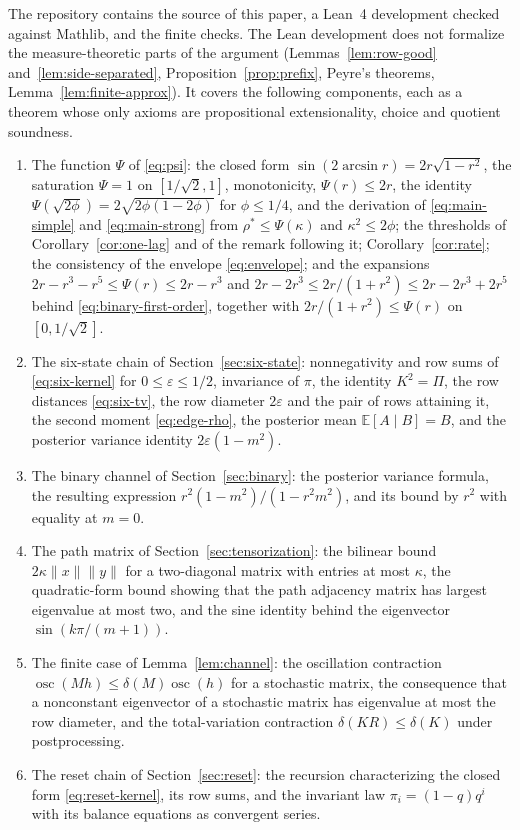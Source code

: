 \documentclass[11pt]{amsart}
\numberwithin{equation}{section}
\theoremstyle{definition}
\newcommand{\EE}{\mathbb E}
\newcommand{\osc}{\operatorname{osc}}
\newcommand{\rhostar}{\rho^{*}}
\begin{document}
The repository \cite{Repo2026} contains the source of this paper, a Lean~4 development checked against Mathlib, and the finite checks. The Lean development does not formalize the measure-theoretic parts of the argument (Lemmas~\ref{lem:row-good} and~\ref{lem:side-separated}, Proposition~\ref{prop:prefix}, Peyre's theorems, Lemma~\ref{lem:finite-approx}). It covers the following components, each as a theorem whose only axioms are propositional extensionality, choice and quotient soundness.
\begin{enumerate}
\item The function $\Psi$ of \eqref{eq:psi}: the closed form $\sin(2\arcsin r)=2r\sqrt{1-r^2}$, the saturation $\Psi=1$ on $[1/\sqrt2,1]$, monotonicity, $\Psi(r)\le2r$, the identity $\Psi(\sqrt{2\phi})=2\sqrt{2\phi(1-2\phi)}$ for $\phi\le1/4$, and the derivation of \eqref{eq:main-simple} and \eqref{eq:main-strong} from $\rhostar\le\Psi(\kappa)$ and $\kappa^2\le2\phi$; the thresholds of Corollary~\ref{cor:one-lag} and of the remark following it; Corollary~\ref{cor:rate}; the consistency of the envelope \eqref{eq:envelope}; and the expansions $2r-r^3-r^5\le\Psi(r)\le2r-r^3$ and $2r-2r^3\le2r/(1+r^2)\le2r-2r^3+2r^5$ behind \eqref{eq:binary-first-order}, together with $2r/(1+r^2)\le\Psi(r)$ on $[0,1/\sqrt2]$.
\item The six-state chain of Section~\ref{sec:six-state}: nonnegativity and row sums of \eqref{eq:six-kernel} for $0\le\varepsilon\le1/2$, invariance of $\pi$, the identity $K^2=\Pi$, the row distances \eqref{eq:six-tv}, the row diameter $2\varepsilon$ and the pair of rows attaining it, the second moment \eqref{eq:edge-rho}, the posterior mean $\EE[A\mid B]=B$, and the posterior variance identity $2\varepsilon(1-m^2)$.
\item The binary channel of Section~\ref{sec:binary}: the posterior variance formula, the resulting expression $r^2(1-m^2)/(1-r^2m^2)$, and its bound by $r^2$ with equality at $m=0$.
\item The path matrix of Section~\ref{sec:tensorization}: the bilinear bound $2\kappa\|x\|\|y\|$ for a two-diagonal matrix with entries at most $\kappa$, the quadratic-form bound showing that the path adjacency matrix has largest eigenvalue at most two, and the sine identity behind the eigenvector $\sin(k\pi/(m+1))$.
\item The finite case of Lemma~\ref{lem:channel}: the oscillation contraction $\osc(Mh)\le\delta(M)\osc(h)$ for a stochastic matrix, the consequence that a nonconstant eigenvector of a stochastic matrix has eigenvalue at most the row diameter, and the total-variation contraction $\delta(KR)\le\delta(K)$ under postprocessing.
\item The reset chain of Section~\ref{sec:reset}: the recursion characterizing the closed form \eqref{eq:reset-kernel}, its row sums, and the invariant law $\pi_i=(1-q)q^i$ with its balance equations as convergent series.
\end{enumerate}
\end{document}
